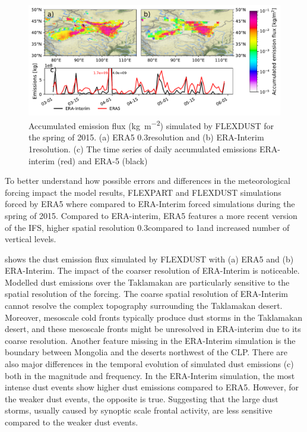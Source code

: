 \begin{figure}[htpb]
    \centering
    \includegraphics[width=\textwidth]{texfiles/figs/emissions_ERA5_ERA-interim.pdf}
    \caption{Accumulated emission flux  (\si{\kg\per\square\metre}) simulated by FLEXDUST for the spring of 2015. (a) ERA5 0.3\degree resolution and (b) ERA-Interim 1\degree resolution. (c) The time series of daily accumulated emissions ERA-interim (red) and ERA-5 (black) }
    \label{fig:ERA5_ERA-interim_emissions}
\end{figure}
To better understand how possible errors and differences in the meteorological forcing impact the model results, FLEXPART and FLEXDUST simulations forced by ERA5 where compared to ERA-Interim forced simulations during the spring of 2015. Compared to ERA-interim, ERA5 features a more recent version of the IFS, higher spatial resolution 0.3\degree compared to 1\degree and increased number of vertical levels. 

 shows the dust emission flux simulated by FLEXDUST with (a) ERA5 and (b) ERA-Interim. 
The impact of the coarser resolution of ERA-Interim is noticeable.  
Modelled dust emissions over the Taklamakan are particularly sensitive to the spatial resolution of the forcing. 
The coarse spatial resolution of ERA-Interim cannot resolve the complex topography surrounding the Taklamakan desert. Moreover, mesoscale cold fronts typically produce dust storms in the Taklamakan desert, and these mesoscale fronts might be unresolved in ERA-interim due to its coarse resolution. 
Another feature missing in the ERA-Interim simulation is the boundary between Mongolia and the deserts northwest of the CLP. There are also major differences in the temporal evolution of simulated dust emissions (c) both in the magnitude and frequency.
In the ERA-Interim simulation, the most intense dust events show higher dust emissions compared to ERA5. 
However, for the weaker dust events, the opposite is true. 
Suggesting that the large dust storms, usually caused by synoptic scale frontal activity, are less sensitive compared to the weaker dust events.

